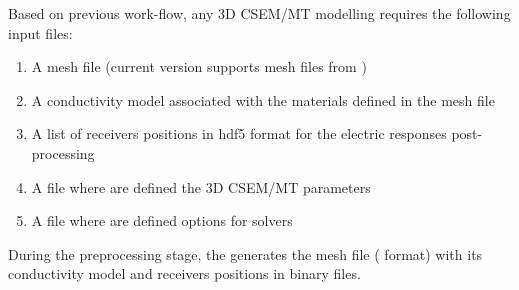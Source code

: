 \documentclass[letterpaper,10pt,english]{sphinxmanual}
\begin{document}
Based on previous work-flow, any 3D CSEM/MT modelling requires the following
input files:
\begin{enumerate}
%
\item {} 
A mesh file (current version supports mesh files from )

\item {} 
A conductivity model associated with the materials defined in the mesh file

\item {} 
A list of receivers positions in hdf5 format for the electric responses post-processing

\item {} 
A  file where are defined the 3D CSEM/MT parameters

\item {} 
A  file where are defined options for  solvers

\end{enumerate}

During the preprocessing stage, the  generates the mesh file ( format) with its
conductivity model and receivers positions in  binary files.
\end{document}
